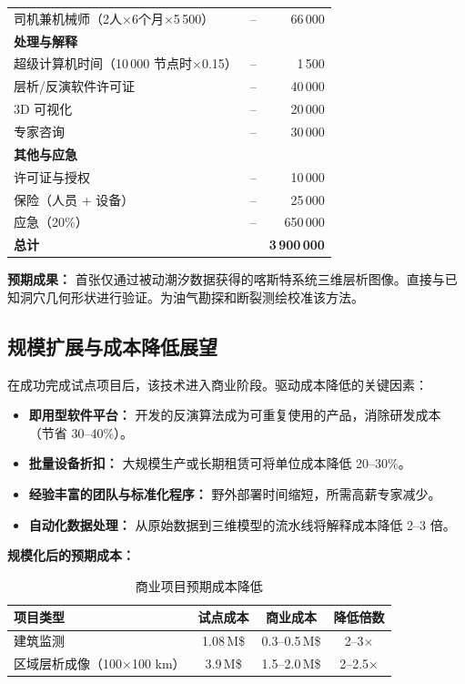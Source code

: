 \documentclass[12pt,a4paper]{article}
\theoremstyle{remark}
\begin{document}
\begin{table}[htbp]
\begin{tabular}{lrr}
			司机兼机械师（2人$\times$6个月$\times$5\,500） & – & 66\,000 \\
			\multicolumn{3}{l}{\textbf{处理与解释}} \\
			超级计算机时间（10\,000 节点时$\times$0.15） & – & 1\,500 \\
			层析/反演软件许可证 & – & 40\,000 \\
			3D 可视化 & – & 20\,000 \\
			专家咨询 & – & 30\,000 \\
			\multicolumn{3}{l}{\textbf{其他与应急}} \\
			许可证与授权 & – & 10\,000 \\
			保险（人员 + 设备） & – & 25\,000 \\
			应急（20\%） & – & 650\,000 \\
			\midrule
			\textbf{总计} & & \textbf{3\,900\,000} \\
			\bottomrule
		\end{tabular}
	\end{table}
	
	\textbf{预期成果：} 首张仅通过被动潮汐数据获得的喀斯特系统三维层析图像。直接与已知洞穴几何形状进行验证。为油气勘探和断裂测绘校准该方法。
	
	\subsection{规模扩展与成本降低展望}
	
	在成功完成试点项目后，该技术进入商业阶段。驱动成本降低的关键因素：
	
	\begin{itemize}
		\item \textbf{即用型软件平台：} 开发的反演算法成为可重复使用的产品，消除研发成本（节省 30–40\%）。
		\item \textbf{批量设备折扣：} 大规模生产或长期租赁可将单位成本降低 20–30\%。
		\item \textbf{经验丰富的团队与标准化程序：} 野外部署时间缩短，所需高薪专家减少。
		\item \textbf{自动化数据处理：} 从原始数据到三维模型的流水线将解释成本降低 2–3 倍。
	\end{itemize}
	
	\textbf{规模化后的预期成本：}
	
	\begin{table}[htbp]
		\centering
		\caption{商业项目预期成本降低}
		\label{tab:scaling}
		\begin{tabular}{lccc}
			\toprule
			\textbf{项目类型} & \textbf{试点成本} & \textbf{商业成本} & \textbf{降低倍数} \\
			\midrule
			建筑监测 & 1.08\,M\$ & 0.3–0.5\,M\$ & 2–3× \\
			区域层析成像（100×100 km） & 3.9\,M\$ & 1.5–2.0\,M\$ & 2–2.5× \\
			\bottomrule
		\end{tabular}
	\end{table}
	
\end{document}

